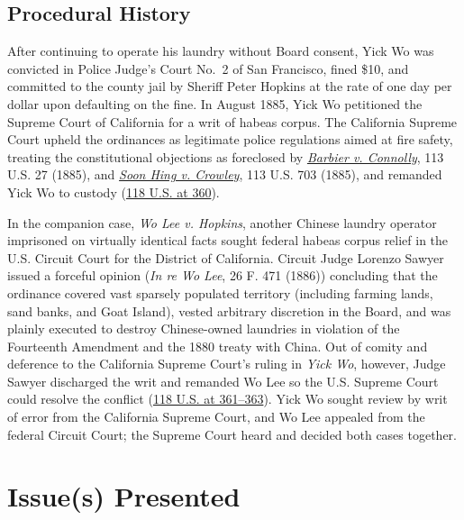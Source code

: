 \documentclass[12pt]{article}
\begin{document}
\subsection{Procedural History}
After continuing to operate his laundry without Board consent, Yick Wo was convicted in Police Judge's Court No.~2 of San Francisco, fined \$10, and committed to the county jail by Sheriff Peter Hopkins at the rate of one day per dollar upon defaulting on the fine. In August 1885, Yick Wo petitioned the Supreme Court of California for a writ of habeas corpus. The California Supreme Court upheld the ordinances as legitimate police regulations aimed at fire safety, treating the constitutional objections as foreclosed by \href{https://supreme.justia.com/cases/federal/us/113/27/}{\emph{Barbier v. Connolly}}, 113 U.S. 27 (1885), and \href{https://supreme.justia.com/cases/federal/us/113/703/}{\emph{Soon Hing v. Crowley}}, 113 U.S. 703 (1885), and remanded Yick Wo to custody (\href{https://supreme.justia.com/cases/federal/us/118/356/}{118 U.S. at 360}).

In the companion case, \emph{Wo Lee v. Hopkins}, another Chinese laundry operator imprisoned on virtually identical facts sought federal habeas corpus relief in the U.S. Circuit Court for the District of California. Circuit Judge Lorenzo Sawyer issued a forceful opinion (\emph{In re Wo Lee}, 26 F. 471 (1886)) concluding that the ordinance covered vast sparsely populated territory (including farming lands, sand banks, and Goat Island), vested arbitrary discretion in the Board, and was plainly executed to destroy Chinese-owned laundries in violation of the Fourteenth Amendment and the 1880 treaty with China. Out of comity and deference to the California Supreme Court's ruling in \emph{Yick Wo}, however, Judge Sawyer discharged the writ and remanded Wo Lee so the U.S. Supreme Court could resolve the conflict (\href{https://supreme.justia.com/cases/federal/us/118/356/}{118 U.S. at 361--363}). Yick Wo sought review by writ of error from the California Supreme Court, and Wo Lee appealed from the federal Circuit Court; the Supreme Court heard and decided both cases together.

\section{Issue(s) Presented}
\end{document}
